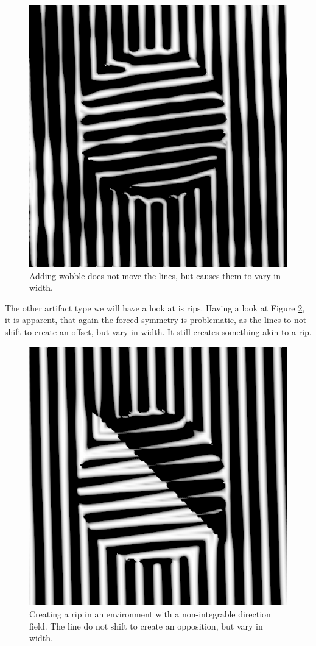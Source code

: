 \documentclass{utue} %
\begin{document}
\begin{figure}[ht]
  \centering
  \includegraphics[width=0.45\linewidth]{images/multiDirWobble}
  \caption{Adding wobble does not move the lines, but causes them to vary in width.}\label{fig:multiDirWobble}
\end{figure}

The other artifact type we will have a look at is rips. Having a look at Figure \ref{fig:multiDirRip}, it is apparent, that again the forced symmetry is problematic, as the lines to not shift to create an offset, but vary in width. It still creates something akin to a rip.

\begin{figure}[ht]
  \centering
  \includegraphics[width=0.45\linewidth]{images/multiDirRip}
  \caption{Creating a rip in an environment with a non-integrable direction field. The line do not shift to create an opposition, but vary in width.}\label{fig:multiDirRip}
\end{figure}


\FloatBarrier
\printbibliography
\end{document}
